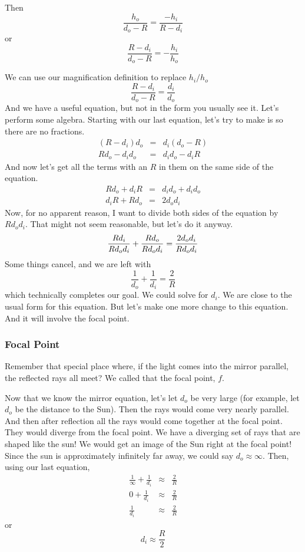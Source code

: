 \documentclass{article}
\begin{document}
Then%
\[
\frac{h_{o}}{d_{o}-R}=\frac{-h_{i}}{R-d_{i}}
\]%
or%
\[
\frac{R-d_{i}}{d_{o}-R}=-\frac{h_{i}}{h_{o}}
\]

We can use our magnification definition to replace $h_{i}/h_{o}$%
\[
\frac{R-d_{i}}{d_{o}-R}=\frac{d_{i}}{d_{o}}
\]%
And we have a useful equation, but not in the form you usually see it. Let's
perform some algebra. Starting with our last equation, let's try to make is
so there are no fractions.%
\begin{eqnarray*}
\left( R-d_{i}\right) d_{o} &=&d_{i}\left( d_{o}-R\right) \\
Rd_{o}-d_{i}d_{o} &=&d_{i}d_{o}-d_{i}R
\end{eqnarray*}%
And now let's get all the terms with an $R$ in them on the same side of the
equation. 
\begin{eqnarray*}
Rd_{o}+d_{i}R &=&d_{i}d_{o}+d_{i}d_{o} \\
d_{i}R+Rd_{o} &=&2d_{o}d_{i}
\end{eqnarray*}%
Now, for no apparent reason, I want to divide both sides of the equation by $%
Rd_{o}d_{i}.$ That might not seem reasonable, but let's do it anyway. 
\[
\frac{Rd_{i}}{Rd_{o}d_{i}}+\frac{Rd_{o}}{Rd_{o}d_{i}}=\frac{2d_{o}d_{i}}{%
Rd_{o}d_{i}}
\]%
Some things cancel, and we are left with 
\[
\frac{1}{d_{o}}+\frac{1}{d_{i}}=\frac{2}{R}
\]%
which technically completes our goal. We could solve for $d_{i}.$ We are
close to the usual form for this equation. But let's make one more change to
this equation. And it will involve the focal point.

\subsubsection{Focal Point}

Remember that special place where, if the light comes into the mirror
parallel, the reflected rays all meet? We called that the focal point, $f$.

Now that we know the mirror equation, let's let $d_{o}$ be very large (for
example, let $d_{o}$ be the distance to the Sun). Then the rays would come
very nearly parallel. And then after reflection all the rays would come
together at the focal point. They would diverge from the focal point. We
have a diverging set of rays that are shaped like the sun! We would get an
image of the Sun right at the focal point! Since the sun is approximately
infinitely far away, we could say $d_{o}\approx \infty .$ Then, using our
last equation, 
\begin{eqnarray*}
\frac{1}{\infty }+\frac{1}{d_{i}} &\approx &\frac{2}{R} \\
0+\frac{1}{d_{i}} &\approx &\frac{2}{R} \\
\frac{1}{d_{i}} &\approx &\frac{2}{R}
\end{eqnarray*}%
or 
\[
d_{i}\approx \frac{R}{2}
\]
\end{document}
